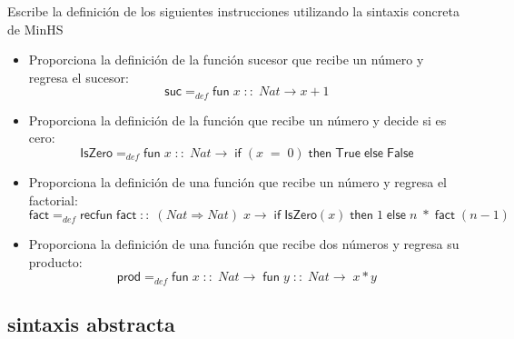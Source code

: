     \begin{exercise}
    Escribe la definición de los siguientes instrucciones utilizando la sintaxis concreta de \textsf{MinHS}\\

	\begin{itemize}
		\item Proporciona la definición de la función sucesor que recibe un número y regresa el sucesor: 
			$$ \textsf{suc} =_{def} \textsf{fun}\; x\;::\; \textit{Nat} \rightarrow x + 1$$
		\item Proporciona la definición de la función que recibe un número y decide si es cero:
			 $$ \textsf{IsZero} =_{def} \textsf{fun}\; x\;::\; \textit{Nat} \rightarrow\; \textsf{if}\; (x\; =\; 0) \; \textsf{then}\; \textsf{True}\; \textsf{else}\; \textsf{False}$$
		\item Proporciona la definición de una función que recibe un número y regresa el factorial:
			 $$ \textsf{fact} =_{def} \textsf{recfun}\; \textsf{fact}\; ::\; (\textit{Nat} \Rightarrow \textit{Nat})\; x \rightarrow\; \textsf{if}\; \textsf{IsZero}(x)\; \textsf{then}\; 1\; \textsf{else}\; n\; *\; \textsf{fact}\; (n-1)$$
		\item Proporciona la definición de una función que recibe dos números y regresa su producto:
			$$ \textsf{prod} =_{def} \textsf{fun}\; x\; ::\; Nat \rightarrow\; \textsf{fun}\; y\; ::\; Nat \rightarrow\; x*y$$
	\end{itemize}

    \end{exercise}

\subsection{sintaxis abstracta}

